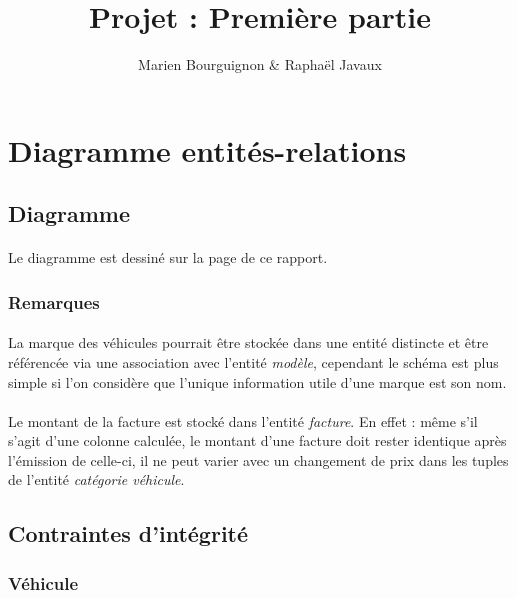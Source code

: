 \documentclass[a4paper]{article}
\title{Projet : Première partie}
\author{Marien Bourguignon \& Raphaël Javaux}
\date{}
\newenvironment{changemargin}[2]{%
\begin{list}{}{%
\setlength{\topsep}{0pt}%
\setlength{\leftmargin}{#1}%
\setlength{\rightmargin}{#2}%
\setlength{\listparindent}{\parindent}%
\setlength{\itemindent}{\parindent}%
\setlength{\parsep}{\parskip}%
}%
\item[]}{\end{list}}
\begin{document}
\maketitle

\begin{changemargin}{-1cm}{-1cm}

\section{Diagramme entités-relations}
  \subsection{Diagramme}

    \paragraph{}Le diagramme est dessiné sur la page \pageref{diagramme} de ce
    rapport.

    \subsubsection{Remarques}

    \paragraph{}La marque des véhicules pourrait être stockée dans une entité
    distincte et être référencée via une association avec l'entité
    \textit{modèle}, cependant le schéma est plus simple si l'on considère que
    l'unique information utile d'une marque est son nom.

    \paragraph{}Le montant de la facture est stocké dans l'entité \textit{facture}.
    En effet : même s'il s'agit d'une colonne calculée, le montant d'une facture
    doit rester identique après l'émission de celle-ci, il ne peut varier avec
    un changement de prix dans les tuples de l'entité
    \textit{catégorie véhicule}.

  \subsection{Contraintes d'intégrité}

    \subsubsection{Véhicule}


\end{changemargin}
\end{document}
